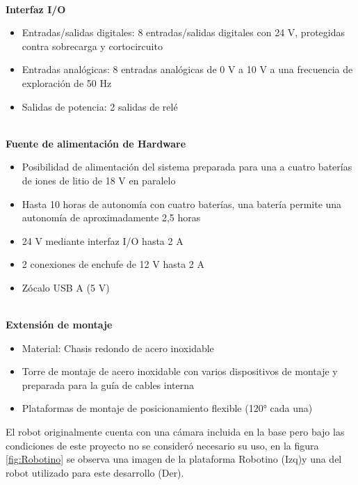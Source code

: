             \phantom{saltodelineaforzado >:D}\\
            
            \textbf{Interfaz I/O}
            \begin{itemize}
                \item Entradas/salidas digitales: 8 entradas/salidas digitales con 24 V, protegidas contra sobrecarga y cortocircuito
                \item Entradas analógicas: 8 entradas analógicas de 0 V a 10 V a una frecuencia de exploración de 50 Hz
                \item Salidas de potencia: 2 salidas de relé
            \end{itemize}

            \phantom{saltodelineaforzado >:D}\\
            
            \textbf{Fuente de alimentación de Hardware}
            \begin{itemize}
                \item Posibilidad de alimentación del sistema preparada para una a cuatro baterías de iones de litio de 18 V en paralelo
                \item Hasta 10 horas de autonomía con cuatro baterías, una batería permite una autonomía de aproximadamente 2,5 horas
                \item 24 V mediante interfaz I/O hasta 2 A
                \item 2 conexiones de enchufe de 12 V hasta 2 A
                \item Zócalo USB A (5 V)
            \end{itemize}

            \phantom{saltodelineaforzado >:D}\\
            
            \textbf{Extensión de montaje}
            \begin{itemize}
                \item Material: Chasis redondo de acero inoxidable
                \item Torre de montaje de acero inoxidable con varios dispositivos de montaje y preparada para la guía de cables interna
                \item Plataformas de montaje de posicionamiento flexible (120° cada una)
            \end{itemize}

            El robot originalmente cuenta con una cámara incluida en la base pero bajo las condiciones de este proyecto no se consideró necesario su uso, en la figura \ref{fig:Robotino} se observa una imagen de la plataforma Robotino (Izq)y una del robot utilizado para este desarrollo (Der).

